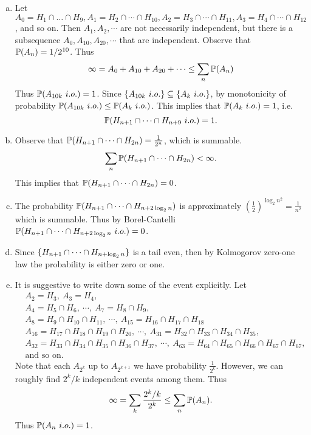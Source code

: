 \begin{solution}
	\begin{enumerate}[(a)]
		\item Let $ A_0 = H_1\cap\dots\cap H_{9}, A_1 = H_2\cap\cdots\cap H_{10}, A_2 = H_3\cap\cdots\cap H_{11}, A_3 = H_4\cap\cdots\cap H_{12} $, and so on. Then $ A_1,A_2,\cdots $ are not necessarily independent, but there is a subsequence $ A_0,A_{10},A_{20},\cdots $ that are independent. Observe that $ \mathbb{P}(A_n) = 1/2^{10} $. Thus 
		\[ \infty = A_0+A_{10}+A_{20}+\cdots \leq \sum_n \mathbb{P}(A_n)  \]
		 Thus $ \mathbb{P}(A_{10k}\ i.o.) = 1 $. Since $ \set{A_{10k}\ i.o.} \subseteq \set{A_{k}\ i.o.} $, by monotonicity of probability $ \mathbb{P}(A_{10k}\ i.o.)\leq\mathbb{P}(A_k\ i.o.) $. This implies that $ \mathbb{P}(A_k\ i.o.) = 1 $, i.e. \[ \mathbb{P}(H_{n+1}\cap\cdots\cap H_{n+9}\ i.o.) = 1. \]
		 \item Observe that $ \mathbb{P}(H_{n+1}\cap\cdots\cap H_{2n}) = \frac{1}{2^n} $, which is summable.
		 \[ \sum_n \mathbb{P}(H_{n+1}\cap\cdots\cap H_{2n}) < \infty. \] 
		 This implies that $ \mathbb{P}(H_{n+1}\cap\cdots\cap H_{2n}) = 0 $.
		 \item The probability $ \mathbb{P}(H_{n+1}\cap\dots\cap H_{n+2\log_2n}) $ is approximately $ (\frac{1}{2})^{\log_2n^2} = \frac{1}{n^2} $ which is summable. Thus by Borel-Cantelli $ \mathbb{P}(H_{n+1}\cap\cdots\cap H_{n+2\log_2n}\ i.o.) = 0 $.
		 
		 \item Since $ \{H_{n+1}\cap\cdots\cap H_{n+\log_2n}\} $ is a tail even, then by Kolmogorov zero-one law the probability is either zero or one.
		 
		 \item It is suggestive to write down some of the event explicitly. Let
		 \begin{align*}
		 	&A_2 = H_3,\ A_3=H_4,\\
		 	& A_4=H_5\cap H_6,\ \cdots ,\ A_7 = H_8\cap H_9,\\
		 	& A_8=H_9\cap H_{10}\cap H_{11},\ \cdots,\  A_{15}=H_{16}\cap H_{17}\cap H_{18} \\
		 	& A_{16}=H_{17}\cap H_{18}\cap H_{19}\cap H_{20},\ \cdots,\  A_{31} = H_{32}\cap H_{33}\cap H_{34} \cap H_{35},\\
		 	&A_{32}=H_{33}\cap H_{34}\cap H_{35}\cap H_{36}\cap H_{37},\ \cdots,\ A_{63}=H_{64}\cap H_{65}\cap H_{66}\cap H_{67}\cap H_{67}, \\
		 	&\text{and so on.}
		 \end{align*}
		 Note that each $ A_{2^k} $ up to $ A_{2^{k+1}} $ we have probability $ \frac{1}{2^k} $. However, we can roughly find $ 2^k/k $ independent events among them. 
		 Thus 
		 \[ \infty = \sum_k \frac{2^k/k}{2^k} \leq \sum_n \mathbb{P}(A_n). \]
		 Thus $ \mathbb{P}(A_n\ i.o.) = 1 $.
	\end{enumerate}
\end{solution}